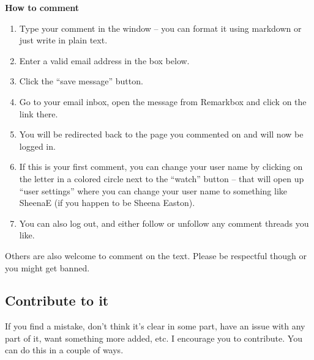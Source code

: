 \documentclass[]{book}
\makeatletter
\providecommand{\tightlist}{%
  \setlength{\itemsep}{0pt}\setlength{\parskip}{0pt}}
\newenvironment{kframe}{%
\medskip{}
\setlength{\fboxsep}{.8em}
 \def\at@end@of@kframe{}%
 \ifinner\ifhmode%
  \def\at@end@of@kframe{\end{minipage}}%
  \begin{minipage}{\columnwidth}%
 \fi\fi%
 \def\FrameCommand##1{\hskip\@totalleftmargin \hskip-\fboxsep
 \colorbox{shadecolor}{##1}\hskip-\fboxsep
     \hskip-\linewidth \hskip-\@totalleftmargin \hskip\columnwidth}%
 \MakeFramed {\advance\hsize-\width
   \@totalleftmargin\z@ \linewidth\hsize
   \@setminipage}}%
 {\par\unskip\endMakeFramed%
 \at@end@of@kframe}
\newenvironment{rmdblock}[1]
  {
  \begin{itemize}
  \renewcommand{\labelitemi}{
    \raisebox{-.7\height}[0pt][0pt]{
      {\setkeys{Gin}{width=3em,keepaspectratio}\texttt{[image: img/\#1]}}
    }
  }
  \setlength{\fboxsep}{1em}
  \begin{kframe}
  \item
  }
  {
  \end{kframe}
  \end{itemize}
  }
\newenvironment{rmdimportant}
  {\begin{rmdblock}{important}}
  {\end{rmdblock}}
\makeatother
\begin{document}
\begin{rmdimportant}
\textbf{How to comment}

\begin{enumerate}
\def\labelenumi{\arabic{enumi}.}
\tightlist
\item
  Type your comment in the window -- you can format it using markdown or
  just write in plain text.
\item
  Enter a valid email address in the box below.
\item
  Click the ``save message'' button.
\item
  Go to your email inbox, open the message from Remarkbox and click on
  the link there.
\item
  You will be redirected back to the page you commented on and will now
  be logged in.
\item
  If this is your first comment, you can change your user name by
  clicking on the letter in a colored circle next to the ``watch''
  button -- that will open up ``user settings'' where you can change
  your user name to something like SheenaE (if you happen to be Sheena
  Easton).
\item
  You can also log out, and either follow or unfollow any comment
  threads you like.
\end{enumerate}
\end{rmdimportant}

Others are also welcome to comment on the text. Please be respectful though or you might get banned.

\hypertarget{contribute-to-it}{%
\subsection*{Contribute to it}\label{contribute-to-it}}


If you find a mistake, don't think it's clear in some part, have an issue with any part of it, want something more added, etc. I encourage you to contribute. You can do this in a couple of ways.
\end{document}
